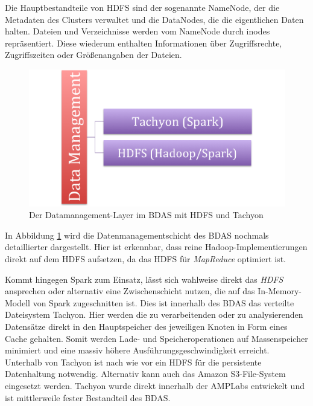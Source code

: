 Die Hauptbestandteile von HDFS sind der sogenannte NameNode, der die Metadaten des Clusters verwaltet und die DataNodes, die die eigentlichen Daten halten. Dateien und Verzeichnisse werden vom NameNode durch inodes repräsentiert. Diese wiederum enthalten Informationen über Zugriffsrechte, Zugriffszeiten oder Größenangaben der Dateien.



\begin{figure}[htb!] 
\centering
\includegraphics[width=1.0\textwidth]{bilder/2_3_stack.png}
\caption{Der Datamanagement-Layer im BDAS mit HDFS und Tachyon}
\label{fig:datamgmtlayer}
\end{figure} 

 

In Abbildung \ref{fig:datamgmtlayer} wird die Datenmanagementschicht des BDAS nochmals detaillierter dargestellt. Hier ist erkennbar, dass reine Hadoop-Implementierungen direkt auf dem HDFS aufsetzen, da das HDFS für \textit{MapReduce} optimiert ist. 

Kommt hingegen Spark zum Einsatz, lässt sich wahlweise direkt das \textit{HDFS} ansprechen oder alternativ eine Zwischenschicht nutzen, die auf das In-Memory-Modell von Spark zugeschnitten ist. Dies ist innerhalb des BDAS das verteilte Dateisystem Tachyon. Hier werden die zu verarbeitenden oder zu analysierenden Datensätze direkt in den Hauptspeicher des jeweiligen Knoten in Form eines Cache gehalten. Somit werden Lade- und Speicheroperationen auf Massenspeicher minimiert und eine massiv höhere Ausführungsgeschwindigkeit erreicht. Unterhalb von Tachyon ist nach wie vor ein HDFS für die persistente Datenhaltung notwendig. Alternativ kann auch das Amazon S3-File-System eingesetzt werden. Tachyon wurde direkt innerhalb der AMPLabs entwickelt und ist mittlerweile fester Bestandteil des BDAS.  


